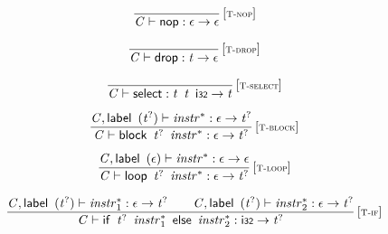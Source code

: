 $$
\begin{array}{@{}c@{}}\displaystyle
\frac{
}{
{\mathit{C}} \vdash \mathsf{nop} : \epsilon \rightarrow \epsilon
} \, {[\textsc{\scriptsize T{-}nop}]}
\qquad
\end{array}
$$

$$
\begin{array}{@{}c@{}}\displaystyle
\frac{
}{
{\mathit{C}} \vdash \mathsf{drop} : {\mathit{t}} \rightarrow \epsilon
} \, {[\textsc{\scriptsize T{-}drop}]}
\qquad
\end{array}
$$

\vspace{1ex}

$$
\begin{array}{@{}c@{}}\displaystyle
\frac{
}{
{\mathit{C}} \vdash \mathsf{select} : {\mathit{t}}~\,{\mathit{t}}~\,\mathsf{i{\scriptstyle32}} \rightarrow {\mathit{t}}
} \, {[\textsc{\scriptsize T{-}select}]}
\qquad
\end{array}
$$

\vspace{1ex}

$$
\begin{array}{@{}c@{}}\displaystyle
\frac{
{\mathit{C}}, \mathsf{label}~\,({{\mathit{t}}^?}) \vdash {{\mathit{instr}}^\ast} : \epsilon \rightarrow {{\mathit{t}}^?}
}{
{\mathit{C}} \vdash \mathsf{block}~\,{{\mathit{t}}^?}~\,{{\mathit{instr}}^\ast} : \epsilon \rightarrow {{\mathit{t}}^?}
} \, {[\textsc{\scriptsize T{-}block}]}
\qquad
\end{array}
$$

$$
\begin{array}{@{}c@{}}\displaystyle
\frac{
{\mathit{C}}, \mathsf{label}~\,(\epsilon) \vdash {{\mathit{instr}}^\ast} : \epsilon \rightarrow \epsilon
}{
{\mathit{C}} \vdash \mathsf{loop}~\,{{\mathit{t}}^?}~\,{{\mathit{instr}}^\ast} : \epsilon \rightarrow {{\mathit{t}}^?}
} \, {[\textsc{\scriptsize T{-}loop}]}
\qquad
\end{array}
$$

$$
\begin{array}{@{}c@{}}\displaystyle
\frac{
{\mathit{C}}, \mathsf{label}~\,({{\mathit{t}}^?}) \vdash {{\mathit{instr}}_{{1}}^\ast} : \epsilon \rightarrow {{\mathit{t}}^?}
 \qquad
{\mathit{C}}, \mathsf{label}~\,({{\mathit{t}}^?}) \vdash {{\mathit{instr}}_{{2}}^\ast} : \epsilon \rightarrow {{\mathit{t}}^?}
}{
{\mathit{C}} \vdash \mathsf{if}~\,{{\mathit{t}}^?}~\,{{\mathit{instr}}_{{1}}^\ast}~\,\mathsf{else}~\,{{\mathit{instr}}_{{2}}^\ast} : \mathsf{i{\scriptstyle32}} \rightarrow {{\mathit{t}}^?}
} \, {[\textsc{\scriptsize T{-}if}]}
\qquad
\end{array}
$$

